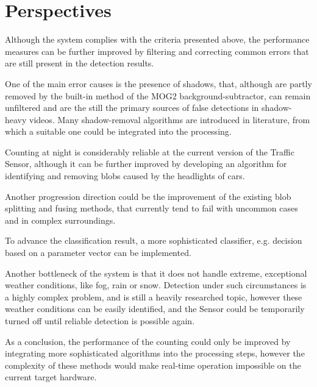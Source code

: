 
\section{Perspectives}
Although the system complies with the criteria presented above, the performance measures can be further improved by filtering and correcting common errors that are still present in the detection results.

One of the main error causes is the presence of shadows, that, although are partly removed by the built-in method of the MOG2 background-subtractor, can remain unfiltered and are the still the primary sources of false detections in shadow-heavy videos.
Many shadow-removal algorithms are introduced in literature, from which a suitable one could be integrated into the processing.

Counting at night is considerably reliable at the current version of the Traffic Sensor, although it can be further improved by developing an algorithm for identifying and removing blobs caused by the headlights of cars.

Another progression direction could be the improvement of the existing blob splitting and fusing methods, that currently tend to fail with uncommon cases and in complex surroundings.

To advance the classification result, a more sophisticated classifier, e.g. decision based on a parameter vector can be implemented.

Another bottleneck of the system is that it does not handle extreme, exceptional weather conditions, like fog, rain or snow.
Detection under such circumstances is a highly complex problem, and is still a heavily researched topic, however these weather conditions can be easily identified, and the Sensor could be temporarily turned off until reliable detection is possible again.
	
As a conclusion, the performance of the counting could only be improved by integrating more sophisticated algorithms into the processing steps, however the complexity of these methods would make real-time operation impossible on the current target hardware.